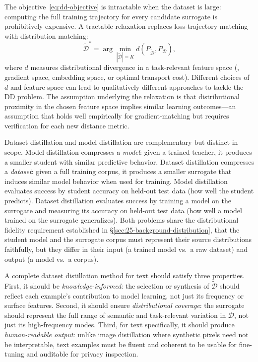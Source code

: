 \begin{foldable}
  The objective~\eqref{eq:dd-objective} is intractable when the dataset is large: computing the full training trajectory for every candidate surrogate is prohibitively expensive.
  A tractable relaxation replaces loss-trajectory matching with distribution matching:
  \begin{equation}
    \tilde{\mathcal{D}}^{*} = \arg\min_{|\tilde{\mathcal{D}}|=K} d(P_{\tilde{\mathcal{D}}}, P_{\mathcal{D}}),
    \label{eq:dm-abstract}
  \end{equation}
  where $d$ measures distributional divergence in a task-relevant feature space (\eg, gradient space, embedding space, or optimal transport cost).
  Different choices of $d$ and feature space can lead to qualitatively different approaches to tackle the \ac{DD} problem.
  The assumption underlying the relaxation is that distributional proximity in the chosen feature space implies similar learning outcomes---an assumption that holds well empirically for gradient-matching but requires verification for each new distance metric.
\end{foldable}

\begin{foldable}
  Dataset distillation and model distillation are complementary but distinct in scope.
  Model distillation compresses a \textit{model}: given a trained teacher, it produces a smaller student with similar predictive behavior.
  Dataset distillation compresses a \textit{dataset}: given a full training corpus, it produces a smaller surrogate that induces similar model behavior when used for training.
  Model distillation evaluates success by student accuracy on held-out test data (how well the student predicts).
  Dataset distillation evaluates success by training a model on the surrogate and measuring its accuracy on held-out test data (how well a model trained on the surrogate generalizes).
  Both problems share the distributional fidelity requirement established in \S\ref{sec:25-background-distribution}, that the student model and the surrogate corpus must represent their source distributions faithfully, but they differ in their input (a trained model vs.\ a raw dataset) and output (a model vs.\ a corpus).
\end{foldable}

\begin{foldable}
  A complete dataset distillation method for text should satisfy three properties.
  First, it should be \textit{knowledge-informed}: the selection or synthesis of $\tilde{\mathcal{D}}$ should reflect each example's contribution to model learning, not just its frequency or surface features.
  Second, it should ensure \textit{distributional coverage}: the surrogate should represent the full range of semantic and task-relevant variation in $\mathcal{D}$, not just its high-frequency modes.
  Third, for text specifically, it should produce \textit{human-readable output}: unlike image distillation where synthetic pixels need not be interpretable, text examples must be fluent and coherent to be usable for fine-tuning and auditable for privacy inspection.
\end{foldable}

